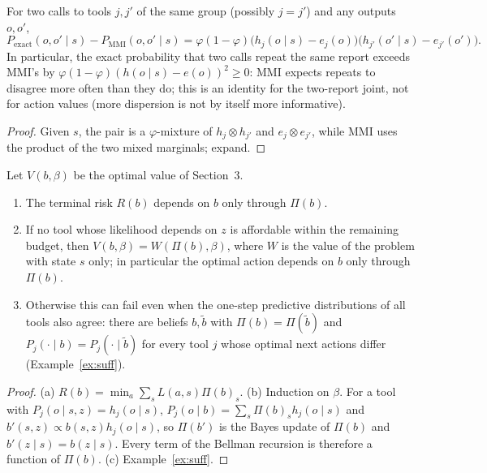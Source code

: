 \begin{lemma}\label{lem:cov}
For two calls to tools $j,j'$ of the same group (possibly $j=j'$) and any outputs $o,o'$,
\[
P_{\mathrm{exact}}(o,o'\mid s)-P_{\mathrm{MMI}}(o,o'\mid s)=\varphi(1-\varphi)\big(h_j(o\mid s)-e_j(o)\big)\big(h_{j'}(o'\mid s)-e_{j'}(o')\big).
\]
In particular, the exact probability that two calls repeat the same report exceeds MMI's by
$\varphi(1-\varphi)(h(o\mid s)-e(o))^2\ge0$: MMI expects repeats to disagree more often than they do; this is an identity for the two-report joint, not for action values (more dispersion is not by itself more informative).
\end{lemma}
\begin{proof}
Given $s$, the pair is a $\varphi$-mixture of $h_j\otimes h_{j'}$ and $e_j\otimes e_{j'}$, while MMI uses the product of
the two mixed marginals; expand.
\end{proof}

\begin{proposition}\label{prop:suff}
Let $V(b,\beta)$ be the optimal value of Section~3.
\begin{enumerate}
\item[(a)] The terminal risk $R(b)$ depends on $b$ only through $\Pi(b)$.
\item[(b)] If no tool whose likelihood depends on $z$ is affordable within the remaining budget, then
$V(b,\beta)=W(\Pi(b),\beta)$, where $W$ is the value of the problem with state $s$ only; in particular the optimal
action depends on $b$ only through $\Pi(b)$.
\item[(c)] Otherwise this can fail even when the one-step predictive distributions of all tools also agree: there are
beliefs $b,\tilde b$ with $\Pi(b)=\Pi(\tilde b)$ and $P_j(\cdot\mid b)=P_j(\cdot\mid\tilde b)$ for every tool $j$ whose
optimal next actions differ (Example~\ref{ex:suff}).
\end{enumerate}
\end{proposition}
\begin{proof}
(a) $R(b)=\min_a\sum_sL(a,s)\Pi(b)_s$. (b) Induction on $\beta$. For a tool with $P_j(o\mid s,z)=h_j(o\mid s)$,
$P_j(o\mid b)=\sum_s\Pi(b)_sh_j(o\mid s)$ and $b'(s,z)\propto b(s,z)h_j(o\mid s)$, so $\Pi(b')$ is the Bayes update of
$\Pi(b)$ and $b'(z\mid s)=b(z\mid s)$. Every term of the Bellman recursion is therefore a function of $\Pi(b)$.
(c) Example~\ref{ex:suff}.
\end{proof}

